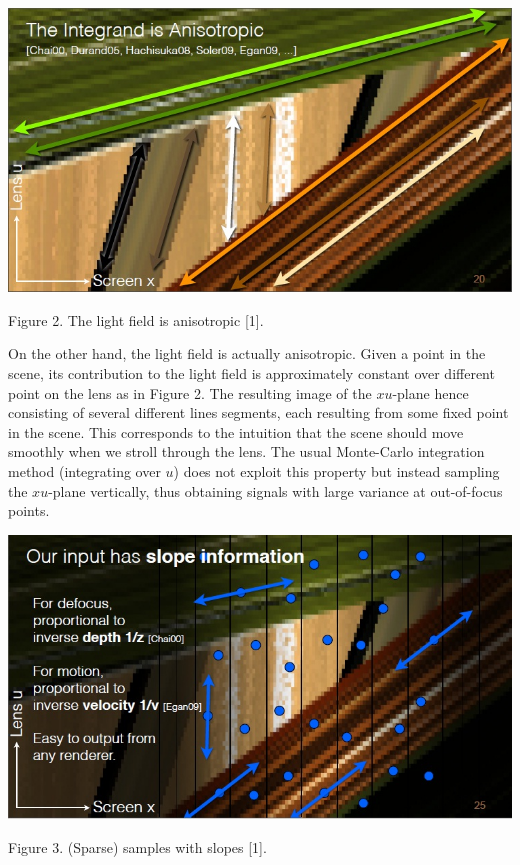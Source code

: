 \documentclass{article}
\begin{document}
\begin{center}
  \includegraphics[scale=0.8]{./anisotropy.jpg}

  \small{Figure 2. The light field is anisotropic [1].}
\end{center}

On the other hand, the light field is actually anisotropic. Given a point in the scene, its contribution to the light field is approximately constant over different point on the lens as in Figure 2. The resulting image of the $xu$-plane hence consisting of several different lines segments, each resulting from some fixed point in the scene. This corresponds to the intuition that the scene should move smoothly when we stroll through the lens. The usual Monte-Carlo integration method (integrating over $u$) does not exploit this property but instead sampling the $xu$-plane vertically, thus obtaining signals with large variance at out-of-focus points.

\begin{center}
  \includegraphics[scale=0.8]{./sample-slope.jpg}

  \small{Figure 3. (Sparse) samples with slopes [1].}
\end{center}
\end{document}
